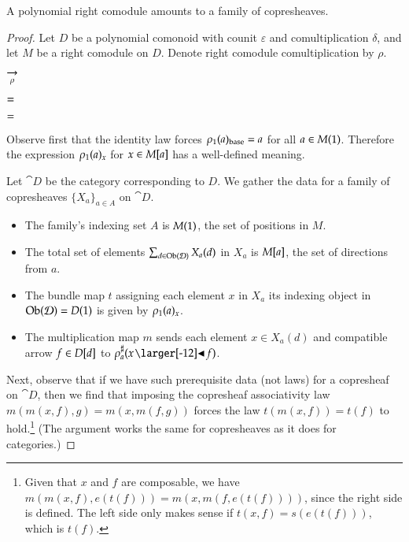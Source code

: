 \documentclass{amsart}
\begin{document}
\begin{prop}
  A polynomial right comodule amounts to a family of copresheaves.
\end{prop}
\begin{proof}
  Let $D$ be a polynomial comonoid with counit $\varepsilon$ and
  comultiplication $\delta$, and let $M$ be a right comodule on
  $D$. Denote right comodule comultiplication by $\rho$.

  \begin{center}
    
    \hspace{-.75em}
    $\underset{\rho}{\to}$
    \hspace{.5em}
    
  \end{center}

  \begin{center}
    
    $=$
    \quad
    
  \end{center}

  \begin{center}
    
    \quad
    $=$
    \quad
    
  \end{center}

  Observe first that the identity law forces ${\rho}_1(a)_{\mathrm{base}} = a$
  for all $a \in M(1)$.
  Therefore the expression ${\rho}_1(a)_x$ for $x \in M[a]$ has a
  well-defined meaning.

  Let $\cat{D}$ be the category corresponding to $D$. We gather the
  data for a family of copresheaves $\{X_a\}_{a \in A}$ on $\cat{D}$.
  \begin{itemize}
  \item The family's indexing set $A$ is $M(1)$, the set
    of positions in $M$.
  \item The total set of elements $\sum_{d \in \operatorname{Ob}(\mathcal{D})}X_a(d)$ in
    $X_a$ is $M[a]$, the set of directions from $a$.
  \item The bundle map $t$ assigning each element $x$ in $X_a$ its indexing
    object in $\operatorname{Ob}(\mathcal{D}) = D(1)$ is given by ${\rho}_1(a)_x$.
  \item The multiplication map $m$ sends each element $x \in X_a(d)$ and compatible
    arrow $f \in D[d]$ to $\dirmapof{\rho}{a}{x \subd f}$.
  \end{itemize}
  
  Next, observe that if we have such prerequisite data (not laws) for
  a copresheaf on $\cat{D}$, then we find that imposing the copresheaf
  associativity law $m(m(x, f), g) = m(x, m(f, g))$ forces the law
  $t(m(x,f)) = t(f)$ to hold.\footnote{Given that $x$ and $f$ are
    composable, we have $m(m(x,f),e(t(f))) = m(x,m(f,e(t(f))))$, since
    the right side is defined. The left side only makes sense if
    $t(x,f) = s(e(t(f)))$, which is $t(f)$.} (The argument works the same
  for copresheaves as it does for categories.)


\end{proof}
\end{document}

